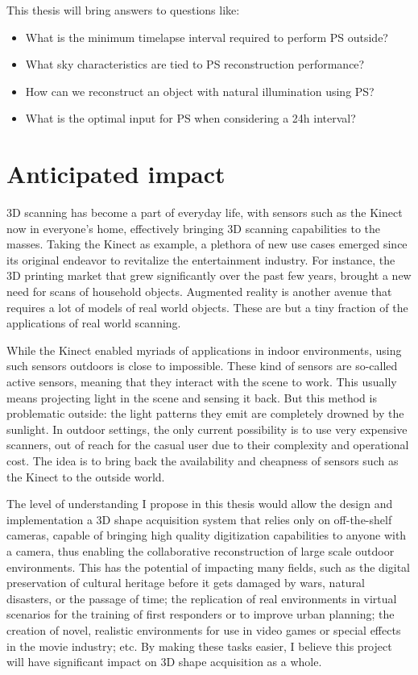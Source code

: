 This thesis will bring answers to questions like:
\begin{itemize}
  \item What is the minimum timelapse interval required to perform PS outside?
  \item What sky characteristics are tied to PS reconstruction performance?
  \item How can we reconstruct an object with natural illumination using PS?
  \item What is the optimal input for PS when considering a 24h interval?
\end{itemize}

\section{Anticipated impact}

3D scanning has become a part of everyday life, with sensors such as the Kinect now in everyone's home, effectively bringing 3D scanning capabilities to the masses. Taking the Kinect as example, a plethora of new use cases emerged since its original endeavor to revitalize the entertainment industry. For instance, the 3D printing market that grew significantly over the past few years, brought a new need for scans of household objects. Augmented reality is another avenue that requires a lot of models of real world objects. These are but a tiny fraction of the applications of real world scanning.

While the Kinect enabled myriads of applications in indoor environments, using such sensors outdoors is close to impossible. These kind of sensors are so-called active sensors, meaning that they interact with the scene to work. This usually means projecting light in the scene and sensing it back. But this method is problematic outside: the light patterns they emit are completely drowned by the sunlight. In outdoor settings, the only current possibility is to use very expensive scanners, out of reach for the casual user due to their complexity and operational cost. The idea is to bring back the availability and cheapness of sensors such as the Kinect to the outside world.

The level of understanding I propose in this thesis would allow the design and implementation a 3D shape acquisition system that relies only on off-the-shelf cameras, capable of bringing high quality digitization capabilities to anyone with a camera, thus enabling the collaborative reconstruction of large scale outdoor environments. This has the potential of impacting many fields, such as the digital preservation of cultural heritage before it gets damaged by wars, natural disasters, or the passage of time; the replication of real environments in virtual scenarios for the training of first responders or to improve urban planning; the creation of novel, realistic environments for use in video games or special effects in the movie industry; etc. By making these tasks easier, I believe this project will have significant impact on 3D shape acquisition as a whole.